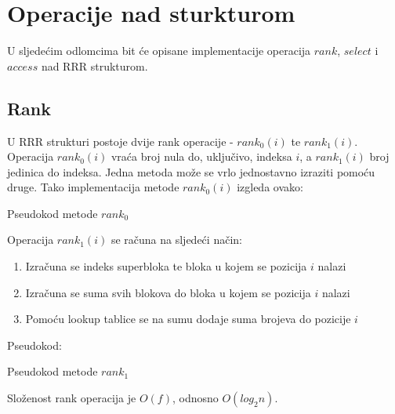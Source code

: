 \documentclass[times, utf8, seminar, numeric]{fer}
\begin{document}
\section{Operacije nad sturkturom}
U sljedećim odlomcima bit će opisane implementacije operacija $rank$, $select$ i $access$ nad RRR strukturom.


\subsection{Rank}
U RRR strukturi postoje dvije rank operacije - $rank_0(i)$ te $rank_1(i)$. Operacija $rank_0(i)$ vraća broj nula do, uključivo, indeksa $i$, a $rank_1(i)$ broj jedinica do indeksa. 
Jedna metoda može se vrlo jednostavno izraziti pomoću druge. Tako implementacija metode $rank_0(i)$ izgleda ovako:


\begin{algorithm}[H]
 \caption{Pseudokod metode $rank_0$}
\end{algorithm}


Operacija $rank_1(i)$ se računa na sljedeći način:
\begin{enumerate}
	\item Izračuna se indeks superbloka te bloka u kojem se pozicija $i$ nalazi
	\item Izračuna se suma svih blokova do bloka u kojem se pozicija $i$ nalazi
	\item Pomoću lookup tablice se na sumu dodaje suma brojeva do pozicije $i$
\end{enumerate}
Pseudokod:

\begin{algorithm}[H]
 \caption{Pseudokod metode $rank_1$}
\end{algorithm}

Složenost rank operacija je $O(f)$, odnosno $O(log_2n)$.
\end{document}
